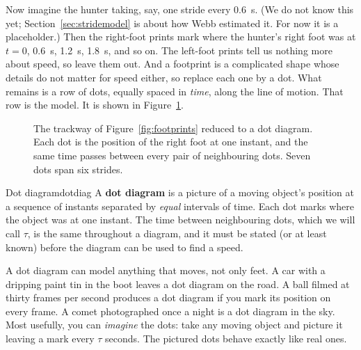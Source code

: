 Now imagine the hunter taking, say, one stride every \SI{0.6}{\second}. (We do not know this yet; Section~\ref{sec:stridemodel} is about how Webb estimated it. For now it is a placeholder.) Then the right-foot prints mark where the hunter's right foot was at $t = 0$, \SI{0.6}{\second}, \SI{1.2}{\second}, \SI{1.8}{\second}, and so on. The left-foot prints tell us nothing more about speed, so leave them out. And a footprint is a complicated shape whose details do not matter for speed either, so replace each one by a dot. What remains is a row of dots, equally spaced in \emph{time}, along the line of motion. That row is the model. It is shown in Figure~\ref{fig:dotdiag}.

\begin{figure}[htb]
\centering
{}
\caption{The trackway of Figure~\ref{fig:footprints} reduced to a dot diagram. Each dot is the position of the right foot at one instant, and the same time passes between every pair of neighbouring dots. Seven dots span six strides.}
\label{fig:dotdiag}
\end{figure}

\begin{definition}{Dot diagram}{dotdiag}
A \textbf{dot diagram} is a picture of a moving object's position at a sequence of instants separated by \emph{equal} intervals of time. Each dot marks where the object was at one instant. The time between neighbouring dots, which we will call $\tau$, is the same throughout a diagram, and it must be stated (or at least known) before the diagram can be used to find a speed.
\end{definition}

A dot diagram can model anything that moves, not only feet. A car with a dripping paint tin in the boot leaves a dot diagram on the road. A ball filmed at thirty frames per second produces a dot diagram if you mark its position on every frame. A comet photographed once a night is a dot diagram in the sky. Most usefully, you can \emph{imagine} the dots: take any moving object and picture it leaving a mark every $\tau$ seconds. The pictured dots behave exactly like real ones.

